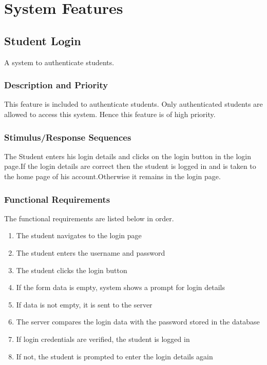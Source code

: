 \documentclass{scrreprt}
\begin{document}
\chapter{System Features}

\section{Student Login}
A system to authenticate students.

\subsection{Description and Priority}
This feature is included to authenticate students. Only authenticated students are allowed to access this system. Hence this feature is of high priority.

\subsection{Stimulus/Response Sequences}
The Student enters his login details and clicks on the login button in the login page.If the login details are correct then the student is logged in and is taken to the home page of his account.Otherwise it remains in the login page.

\subsection{Functional Requirements}
The functional requirements are listed below in order.

\begin{enumerate}
    \item The student navigates to the login page 
    \item The student enters the username and password 
    \item The student clicks the login button 
    \item If the form data is empty, system shows a prompt for login details 
    \item If data is not empty, it is sent to the server 
    \item The server compares the login data with the password stored in the database 
    \item If login credentials are verified, the student is logged in 
    \item If not, the student is prompted to enter the login details again
\end{enumerate} 
\end{document}
